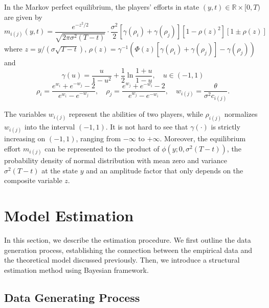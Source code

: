 \documentclass[mnsc]{informs3}
\begin{document}
\begin{lemma}
In the Markov perfect equilibrium, the players’ efforts in state $(y, t) \in\mathbb{R}\times[0, T)$ are given by
\begin{equation}\label{eq-equilibrium-effort}
m_{i(j)}(y, t) = \frac{e^{-z^2/2}}{\sqrt{2\pi\sigma^2(T-t)}}\cdot \frac{\sigma^2}{2}\left[\gamma(\rho_{i}) + \gamma(\rho_{j})\right]\left[1-\rho(z)^2\right]\left[1 \pm \rho(z)\right]
\end{equation}
where $z = y / (\sigma\sqrt{T-t})$, $\rho(z) = \gamma^{-1}\left(\Phi(z)\left[\gamma(\rho_{i})+\gamma(\rho_{j})\right]-\gamma(\rho_{j})\right)$ and 
\begin{equation*}
\gamma(u) = \frac{u}{1-u^2} + \frac{1}{2}\ln\frac{1+u}{1-u},\quad u\in(-1,1)
\end{equation*}
\begin{equation*}
\rho_{i} = \frac{e^{w_{i}}+e^{-w_{j}}-2}{e^{w_{i}}-e^{-w_{j}}},
\quad
\rho_{j} = \frac{e^{w_{j}}+e^{-w_{i}}-2}{e^{w_{j}}-e^{-w_{i}}},
\quad
w_{i(j)} = \frac{\theta}{\sigma^2 c_{i(j)}}.
\end{equation*}
\end{lemma}

The variables $w_{i(j)}$ represent the abilities of two players, while $\rho_{i(j)}$ normalizes $w_{i(j)}$ into the interval $(-1, 1)$. 
It is not hard to see that $\gamma(\cdot)$ is strictly increasing on $(-1,1)$, ranging from $-\infty$ to $+\infty$. 
Moreover, the equilibrium effort $m_{i(j)}$ can be represented to the product of $\phi(y; 0, \sigma^2(T-t))$, the probability density of normal distribution with mean zero and variance $\sigma^2(T-t)$ at the state $y$ and an amplitude factor that only depends on the composite variable $z$. 








\section{Model Estimation}

In this section, we describe the estimation procedure. 
We first outline the data generation process, establishing the connection between the empirical data and the theoretical model discussed previously.
Then, we introduce a structural estimation method using Bayesian framework.

\subsection{Data Generating Process}
\end{document}
